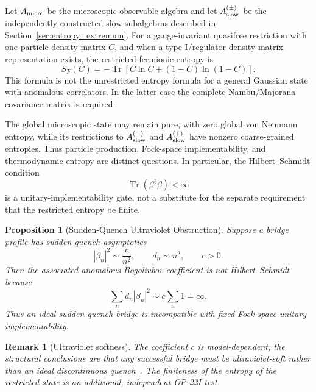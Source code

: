 \documentclass[11pt]{article}
\theoremstyle{canonmath}
\newtheorem{proposition}[theorem]{Proposition}
\newtheorem{remark}[theorem]{Remark}
\theoremstyle{canonpostulate}
\theoremstyle{canonclaim}
\def\mathcal#1{#1}%
\begin{document}
Let $\mathcal A_{\rm micro}$ be the microscopic observable algebra and let $\mathcal A_{\rm slow}^{(\pm)}$ be the independently constructed slow subalgebras described in Section~\ref{sec:entropy_extremum}. For a gauge-invariant quasifree restriction with one-particle density matrix $C$, and when a type-I/regulator density matrix representation exists, the restricted fermionic entropy is
\begin{equation}
S_F(C)=-\operatorname{Tr}\left[C\ln C+(1-C)\ln(1-C)\right].
\end{equation}
This formula is not the unrestricted entropy formula for a general Gaussian state with anomalous correlators. In the latter case the complete Nambu/Majorana covariance matrix is required.

The global microscopic state may remain pure, with zero global von Neumann entropy, while its restrictions to $\mathcal A_{\rm slow}^{(-)}$ and $\mathcal A_{\rm slow}^{(+)}$ have nonzero coarse-grained entropies. Thus particle production, Fock-space implementability, and thermodynamic entropy are distinct questions. In particular, the Hilbert--Schmidt condition
\begin{equation}
\operatorname{Tr}(\beta^\dagger\beta)<\infty
\end{equation}
is a unitary-implementability gate, not a substitute for the separate requirement that the restricted entropy be finite.

\begin{proposition}[Sudden-Quench Ultraviolet Obstruction] \label{prop:sudden_quench}
Suppose a bridge profile has sudden-quench asymptotics
\begin{equation}
|\beta_n|^2\sim\frac{c}{n^2},\qquad d_n\sim n^2,\qquad c>0.
\end{equation}
Then the associated anomalous Bogoliubov coefficient is not Hilbert--Schmidt because
\begin{equation}
\sum_n d_n|\beta_n|^2\sim c\sum_n1=\infty.
\end{equation}
Thus an ideal sudden-quench bridge is incompatible with fixed-Fock-space unitary implementability.
\end{proposition}
\begin{remark}[Ultraviolet softness]
The coefficient $c$ is model-dependent; the structural conclusions are that any successful bridge must be ultraviolet-soft rather than an ideal discontinuous quench~\cite{ShaleStinespring}. The finiteness of the entropy of the restricted state is an additional, independent OP-22I test.
\end{remark}
\end{document}

